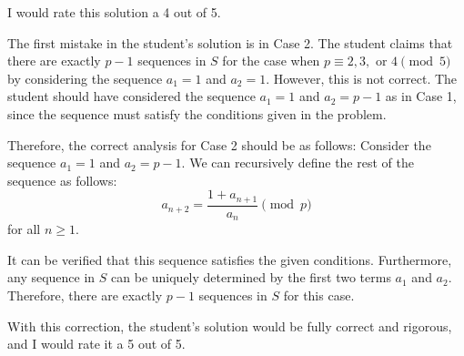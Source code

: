 I would rate this solution a 4 out of 5.

The first mistake in the student's solution is in Case 2. The student claims that there are exactly \(p-1\) sequences in \(S\) for the case when \(p \equiv 2, 3, \text{ or } 4 \pmod{5}\) by considering the sequence \(a_1 = 1\) and \(a_2 = 1\). However, this is not correct. The student should have considered the sequence \(a_1 = 1\) and \(a_2 = p-1\) as in Case 1, since the sequence must satisfy the conditions given in the problem.

Therefore, the correct analysis for Case 2 should be as follows:
Consider the sequence \(a_1 = 1\) and \(a_2 = p-1\). We can recursively define the rest of the sequence as follows:
\[ a_{n+2} = \frac{1 + a_{n+1}}{a_n} \pmod{p} \]
for all \(n \geq 1\).

It can be verified that this sequence satisfies the given conditions. Furthermore, any sequence in \(S\) can be uniquely determined by the first two terms \(a_1\) and \(a_2\). Therefore, there are exactly \(p-1\) sequences in \(S\) for this case.

With this correction, the student's solution would be fully correct and rigorous, and I would rate it a 5 out of 5.
